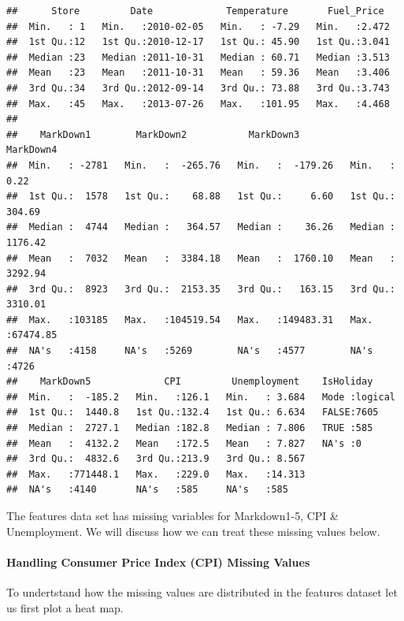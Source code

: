 \documentclass[]{article}
\begin{document}
\begin{verbatim}
##      Store         Date             Temperature       Fuel_Price   
##  Min.   : 1   Min.   :2010-02-05   Min.   : -7.29   Min.   :2.472  
##  1st Qu.:12   1st Qu.:2010-12-17   1st Qu.: 45.90   1st Qu.:3.041  
##  Median :23   Median :2011-10-31   Median : 60.71   Median :3.513  
##  Mean   :23   Mean   :2011-10-31   Mean   : 59.36   Mean   :3.406  
##  3rd Qu.:34   3rd Qu.:2012-09-14   3rd Qu.: 73.88   3rd Qu.:3.743  
##  Max.   :45   Max.   :2013-07-26   Max.   :101.95   Max.   :4.468  
##                                                                    
##    MarkDown1        MarkDown2           MarkDown3           MarkDown4       
##  Min.   : -2781   Min.   :  -265.76   Min.   :  -179.26   Min.   :    0.22  
##  1st Qu.:  1578   1st Qu.:    68.88   1st Qu.:     6.60   1st Qu.:  304.69  
##  Median :  4744   Median :   364.57   Median :    36.26   Median : 1176.42  
##  Mean   :  7032   Mean   :  3384.18   Mean   :  1760.10   Mean   : 3292.94  
##  3rd Qu.:  8923   3rd Qu.:  2153.35   3rd Qu.:   163.15   3rd Qu.: 3310.01  
##  Max.   :103185   Max.   :104519.54   Max.   :149483.31   Max.   :67474.85  
##  NA's   :4158     NA's   :5269        NA's   :4577        NA's   :4726      
##    MarkDown5             CPI         Unemployment    IsHoliday      
##  Min.   :  -185.2   Min.   :126.1   Min.   : 3.684   Mode :logical  
##  1st Qu.:  1440.8   1st Qu.:132.4   1st Qu.: 6.634   FALSE:7605     
##  Median :  2727.1   Median :182.8   Median : 7.806   TRUE :585      
##  Mean   :  4132.2   Mean   :172.5   Mean   : 7.827   NA's :0        
##  3rd Qu.:  4832.6   3rd Qu.:213.9   3rd Qu.: 8.567                  
##  Max.   :771448.1   Max.   :229.0   Max.   :14.313                  
##  NA's   :4140       NA's   :585     NA's   :585
\end{verbatim}

The features data set has missing variables for Markdown1-5, CPI \&
Unemployment. We will discuss how we can treat these missing values
below.

\paragraph{Handling Consumer Price Index (CPI) Missing
Values}\label{handling-consumer-price-index-cpi-missing-values}

To undertstand how the missing values are distributed in the features
dataset let us first plot a heat map.
\end{document}
